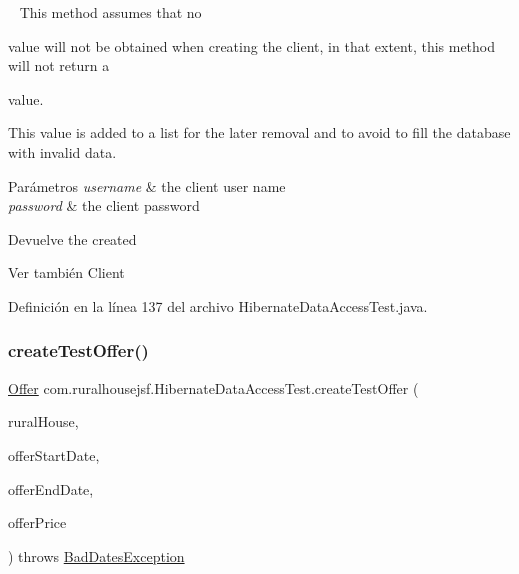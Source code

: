 ~\newline
 This method assumes that no
\begin{DoxyCode}{0}
\DoxyCodeLine{\textcolor{keyword}{null} }
\end{DoxyCode}
 value will not be obtained when creating the client, in that extent, this method will not return a 
\begin{DoxyCode}{0}
\DoxyCodeLine{\textcolor{keyword}{null} }
\end{DoxyCode}
 value. 

This value is added to a list for the later removal and to avoid to fill the database with invalid data.


\begin{DoxyParams}{Parámetros}
{\em username} & the client user name \\
\hline
{\em password} & the client password\\
\hline
\end{DoxyParams}
\begin{DoxyReturn}{Devuelve}
the created
\begin{DoxyCode}{0}
\end{DoxyCode}

\end{DoxyReturn}
\begin{DoxySeeAlso}{Ver también}
Client 
\end{DoxySeeAlso}


Definición en la línea 137 del archivo Hibernate\+Data\+Access\+Test.\+java.

\mbox{\label{classcom_1_1ruralhousejsf_1_1_hibernate_data_access_test_adb47ff6c8ba0fc7e7327407a8c937c4a}} 
\subsubsection{\texorpdfstring{createTestOffer()}{createTestOffer()}}
{\footnotesize\ttfamily \mbox{\hyperlink{classcom_1_1ruralhousejsf_1_1domain_1_1_offer}{Offer}} com.\+ruralhousejsf.\+Hibernate\+Data\+Access\+Test.\+create\+Test\+Offer (\begin{DoxyParamCaption}\item[{\mbox{\hyperlink{classcom_1_1ruralhousejsf_1_1domain_1_1_rural_house}{Rural\+House}}}]{rural\+House,  }\item[{Local\+Date}]{offer\+Start\+Date,  }\item[{Local\+Date}]{offer\+End\+Date,  }\item[{double}]{offer\+Price }\end{DoxyParamCaption}) throws \mbox{\hyperlink{classcom_1_1ruralhousejsf_1_1exceptions_1_1_bad_dates_exception}{Bad\+Dates\+Exception}}\hspace{0.3cm}{\ttfamily [private]}}



